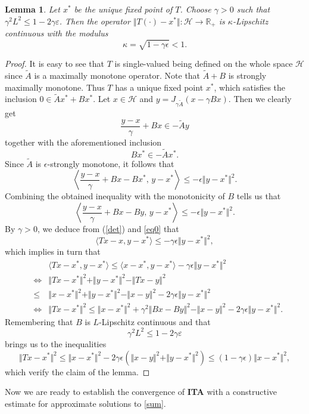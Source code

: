 \documentclass[12pt]{article}
\def\beq{\begin{equation}}
\def\eeq{\end{equation}}
\def\baqn{\begin{eqnarray*}}
\def\eaqn{\end{eqnarray*}}
\theoremstyle{plain}
\newtheorem{lemma}[theorem]{Lemma}
\newcommand{\R}{{\mathbb R}}
\begin{document}
\begin{lemma}\label{ab}
Let $x^*$ be the unique fixed point of $T$. Choose $\gamma>0$ such that $\gamma^2 L^2\le 1-2\gamma\varepsilon $. Then the operator $\Vert T(\cdot)-x^*\Vert: \mathcal{H}\to \R_+$ is $\kappa$-Lipschitz continuous with the modulus
$$
\kappa=\sqrt{1-\gamma\epsilon}<1.
$$
\end{lemma}
\begin{proof}
It is easy to see that $T$ is single-valued being defined on the whole space $\mathcal{H}$ since $\tilde{A}$ is a maximally monotone operator. Note that $\tilde{A}+B$ is strongly maximally monotone. Thus $T$ has a unique fixed point $x^*$, which satisfies the inclusion $0\in \tilde{A}x^*+Bx^*$. Let $x\in \mathcal{H}$ and $y=J_{\gamma \tilde{A}}(x-\gamma Bx)$. Then we clearly get
\beq\label{discr}
\frac{y-x}{\gamma}+Bx\in -\tilde{A}y
\eeq
together with the aforementioned inclusion
$$
Bx^*\in -\tilde{A}x^*.
$$
Since $\tilde{A}$ is $\epsilon$-strongly monotone, it follows that
\[
\left\langle
\frac{y-x}{\gamma}+{B}x-{B}x^*,
\, y-x^*
\right\rangle \le -\epsilon \Vert y-x^*\Vert^2.
\]
Combining the obtained inequality with the  monotonicity of $B$ tells us that
\begin{equation}\label{eq0}
\left\langle
\frac{y-x}{\gamma}+{B}x-{B}y,
\, y-x^*
\right\rangle \le -\epsilon \Vert y-x^*\Vert^2.
\end{equation}
By $\gamma>0$, we deduce from (\ref{det}) and \eqref{eq0} that
\[
\langle Tx-x,  y-x^*\rangle \le -\gamma \epsilon \Vert y-x^*\Vert^2,
\]
which implies in turn that 
\baqn
&&\langle Tx-x^*, y-x^*\rangle\le \langle x-x^*, y-x^*\rangle-\gamma \epsilon \Vert y-x^*\Vert^2\\
&\iff& \Vert Tx-x^*\Vert^2+\Vert y-x^*\Vert^2-\Vert Tx-y\Vert^2\\
&\le&\Vert x-x^*\Vert^2+\Vert y-x^*\Vert^2-\Vert x-y\Vert^2-2\gamma \epsilon \Vert y-x^*\Vert^2\\
&\iff& \Vert Tx-x^*\Vert^2\le \Vert x-x^*\Vert^2+\gamma^2 \Vert Bx-By\Vert^2-\Vert x-y\Vert^2-2\gamma \epsilon \Vert y-x^*\Vert^2.
\eaqn
Remembering that $B$ is $L$-Lipschitz continuous and that 
$$
\gamma^2 L^2\le 1-2\gamma\varepsilon
$$
brings us to the inequalities
$$
\Vert Tx-x^*\Vert^2\le \Vert x-x^*\Vert^2-2\gamma \epsilon (\Vert x-y\Vert^2+\Vert y-x^*\Vert^2)\le(1-\gamma \epsilon) \Vert x-x^*\Vert^2,
$$
which verify the claim of the lemma.
\end{proof}

Now we are ready to establish the convergence of {\bf ITA} with a constructive estimate for approximate solutions to \eqref{sum}.
\end{document}
